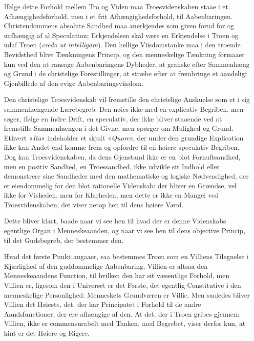 \documentclass[12pt,a4paper]{book}
\newcommand{\opage}[1]{\marginnote{\footnotesize\textit{[#1]}}}
\begin{document}
Ifølge dette Forhold mellem Tro og Viden maa Troesvidenskaben staae i et
Afhængighedsforhold, men i et frit Afhængighedsforhold, til Aabenbaringen.
Christendommens absolute Sandhed maa anerkjendes som given forud for og uafhængig
af al Speculation; Erkjendelsen skal være en Erkjendelse i Troen og udaf Troen
(\textit{credo ut intelligam}). Den hellige Viisdomstanke maa i den troende
Bevidsthed blive Tænkningens Princip, og den menneskelige Tænkning formaaer kun
ved den at ransage Aabenbaringens Dybheder, at granske efter Sammenhæng og Grund
i de christelige Forestillinger, at stræbe efter at frembringe et aandeligt
Gjenbillede af den evige Aabenbaringsviisdom.

Den christelige Troesvidenskab vil fremstille den christelige Anskuelse som et i
sig sammenhængende Lærebegreb. Den nøies ikke med en explicativ Begriben, men
søger, ifølge en indre Drift, en speculativ, der ikke bliver staaende ved at
fremstille Sammenhængen i det Givne, men spørger om Mulighed og Grund. Ethvert
«\textit{Ita}» indeholder et skjult «\textit{Quare}», der under den grundige
Explication ikke kan Andet end komme frem og opfordre til en høiere speculativ
Begriben. Dog kan Troesvidenskaben, da dens Gjenstand ikke er en blot
Fornuftsandhed, men en positiv Sandhed, en Troessandhed, ikke udvikle sit Indhold
eller demonstrere \opage{46}sine Sandheder med den mathematiske og logiske Nødvendighed,
der er eiendommelig for den blot rationelle Videnskab: der bliver en Grændse, vel
ikke for Visheden, men for Klarheden, men dette er ikke en Mangel ved
Troesvidenskaben; det viser netop hen til dens høiere Værd.

Dette bliver klart, baade naar vi see hen til hvad der er denne Videnskabs
egentlige Organ i Menneskeaanden, og naar vi see hen til dens objective Princip,
til det Gudsbegreb, der bestemmer den.

Hvad det første Punkt angaaer, saa bestemmes Troen som en Villiens Tilegnelse i
Kjærlighed af den guddommelige Aabenbaring. Villien er altsaa den Menneskeaandens
Function, til hvilken den har sit væsentlige Forhold, men Villien er, ligesom den
i Universet er det Første, det egentlig Constitutive i den menneskelige
Personlighed: Menneskets Grundværen er Villie. Men saaledes bliver Villien det
Høieste, det, der har Principatet i Forhold til de andre Aandsfunctioner, der ere
afhængige af den. At det, der i Troen gribes gjennem Villien, ikke er
commensurabelt med Tanken, med Begrebet, viser derfor kun, at hint er det Høiere
og Rigere.
\end{document}
